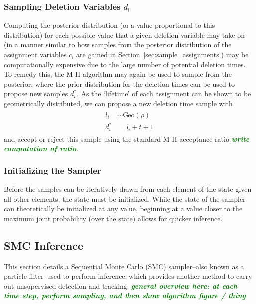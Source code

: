 \documentclass[smallcondensed, final]{svjour3}
\newcommand{\willie}[1]{\textcolor{green}{\textsf{\emph{\textbf{\textcolor{green}{#1}}}}}}
\begin{document}
\subsubsection{Sampling Deletion Variables $d_{i}$}
Computing the posterior distribution (or a value proportional to this distribution) for each possible value that a given deletion variable may take on (in a manner similar to how samples from the posterior distribution of the assignment variables $c_{i}$ are gained in Section~\ref{sec:sample_assignments}) may be computationally expensive due to the large number of potential deletion times. To remedy this, the M-H algorithm may again be used to sample from the posterior, where the prior distribution for the deletion times can be used to propose new samples $d_{i}^{*}$. As the `lifetime' of each assignment can be shown to be geometrically distributed, we can propose a new deletion time sample with
\begin{align}
\begin{split}
l_{i}  &\sim  \text{Geo}(\rho)  \\
d_{i}^{*}  &= l_{i} + t + 1
\end{split}
\end{align}
and accept or reject this sample using the standard M-H acceptance ratio \willie{write computation of ratio}.



\subsubsection{Initializing the Sampler}
Before the samples can be iteratively drawn from each element of the state given all other elements, the state must be initialized. While the state of the sampler can theoretically be initialized at any value, beginning at a value closer to the maximum joint probability (over the state) allows for quicker inference.



\subsection{SMC Inference}

This section details a Sequential Monte Carlo (SMC) sampler--also known as a particle filter--used to perform inference, which provides another method to carry out unsupervised detection and tracking. \willie{general overview here: at each time step, perform sampling, and then show algorithm figure / thing}
\end{document}
